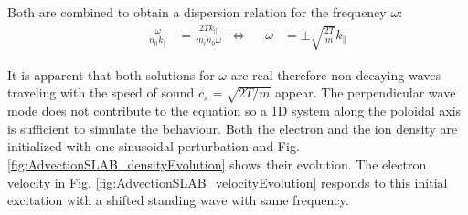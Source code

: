 Both are combined to obtain a dispersion relation for the frequency $\omega$:
\begin{align}
	&& \frac{\omega}{n_0k_\parallel} &= \frac{2T k_\parallel}{m_in_0\omega} 
	&\Leftrightarrow&& \omega &= \pm\sqrt{\frac{2T}{m}}k_\parallel \label{eq:AdvectionLinearAnalysis_dispersionRelation}
\end{align}

It is apparent that both solutions for $\omega$ are real therefore non-decaying waves traveling with the speed of sound $c_s = \sqrt{2T/m}$ appear. The perpendicular wave mode does not contribute to the equation so a 1D system along the poloidal axis is sufficient to simulate the behaviour. Both the electron and the ion density are initialized with one sinusoidal perturbation and Fig. \ref{fig:AdvectionSLAB_densityEvolution} shows their evolution. The electron velocity in Fig. \ref{fig:AdvectionSLAB_velocityEvolution} responds to this initial excitation with a shifted standing wave with same frequency. 

